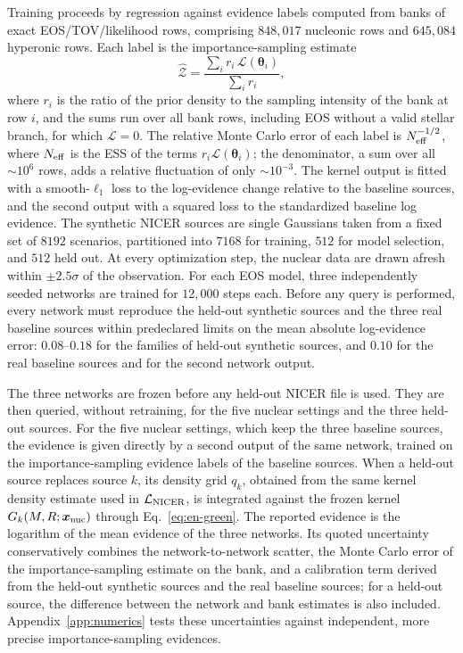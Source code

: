\documentclass[aps,prd,twocolumn,superscriptaddress,nofootinbib,longbibliography]{revtex4-2}
\begin{document}
Training proceeds by regression against evidence labels computed from
banks of exact EOS/TOV/likelihood rows, comprising $848{,}017$ nucleonic rows
and $645{,}084$ hyperonic rows. Each label is the importance-sampling estimate
\begin{equation}
\hat{\mathcal Z}=\frac{\sum_i r_i\,\mathcal L(\bm\theta_i)}{\sum_i r_i},
\label{eq:en-label}
\end{equation}
where $r_i$ is the ratio of the prior density to the sampling intensity of the
bank at row $i$, and the sums run over all bank rows, including EOS without a
valid stellar branch, for which $\mathcal L=0$. The relative Monte Carlo error of each
label is $N_{\rm eff}^{-1/2}$, where $N_{\rm eff}$ is the ESS of the terms
$r_i\mathcal L(\bm\theta_i)$; the denominator, a sum over all ${\sim}10^{6}$
rows, adds a relative fluctuation of only ${\sim}10^{-3}$. The kernel output is fitted with a smooth-$\ell_1$
loss to the log-evidence change relative to the baseline sources, and the
second output with a squared loss to the standardized baseline log evidence. The synthetic NICER sources are single
Gaussians taken from a fixed set of $8192$ scenarios, partitioned into $7168$
for training, $512$ for model selection, and $512$ held out. At every
optimization step, the nuclear data are drawn afresh within $\pm2.5\sigma$ of
the observation. For each EOS model, three independently seeded networks are
trained for $12{,}000$ steps each. Before any query is performed, every network
must reproduce the held-out synthetic sources and the three real baseline
sources within predeclared limits on the mean absolute log-evidence error:
$0.08$--$0.18$ for the families of held-out synthetic sources, and $0.10$ for
the real baseline sources and for the second network output.

The three networks are frozen before any held-out NICER file is
used. They are then queried, without retraining, for the five nuclear settings
and the three held-out sources. For the five nuclear settings, which keep the
three baseline sources, the evidence is given directly by a second output of
the same network, trained on the importance-sampling evidence labels of the baseline sources.
When a held-out source replaces source $k$, its density grid $q_k$, obtained
from the same kernel density estimate used in $\mathcal L_{\rm NICER}$, is
integrated against the frozen kernel $G_k(M,R;\bm x_{\rm nuc})$ through
Eq.~\eqref{eq:en-green}. The reported evidence is the logarithm of the mean
evidence of the three networks. Its quoted uncertainty conservatively combines
the network-to-network scatter, the Monte Carlo error of the
importance-sampling estimate on the bank, and a calibration term derived from
the held-out synthetic sources and the real baseline sources; for a held-out
source, the difference between the network and bank estimates is also
included. Appendix~\ref{app:numerics} tests these uncertainties against
independent, more precise importance-sampling evidences.
\end{document}
